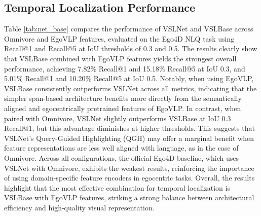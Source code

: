 \documentclass[10pt,twocolumn,letterpaper]{article}
\begin{document}
	
\subsection{Temporal Localization Performance}
	
Table \ref{tab:net_base} compares the performance of VSLNet and VSLBase across Omnivore and EgoVLP features, evaluated on the Ego4D NLQ task using Recall@1 and Recall@5 at IoU thresholds of 0.3 and 0.5. The results clearly show that VSLBase combined with EgoVLP features yields the strongest overall performance, achieving 7.82\% Recall@1 and 15.18\% Recall@5 at IoU 0.3, and 5.01\% Recall@1 and 10.20\% Recall@5 at IoU 0.5.
Notably, when using EgoVLP, VSLBase consistently outperforms VSLNet across all metrics, indicating that the simpler span-based architecture benefits more directly from the semantically aligned and egocentrically pretrained features of EgoVLP. In contrast, when paired with Omnivore, VSLNet slightly outperforms VSLBase at IoU 0.3 Recall@1, but this advantage diminishes at higher thresholds. This suggests that VSLNet’s Query-Guided Highlighting (QGH) may offer a marginal benefit when feature representations are less well aligned with language, as in the case of Omnivore.
Across all configurations, the official Ego4D baseline, which uses VSLNet with Omnivore, exhibits the weakest results, reinforcing the importance of using domain-specific feature encoders in egocentric tasks. Overall, the results highlight that the most effective combination for temporal localization is VSLBase with EgoVLP features, striking a strong balance between architectural efficiency and high-quality visual representation.
	
\end{document}
